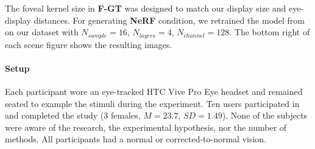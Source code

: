 The foveal kernel size in {\bf F-GT} was designed to match our display size and eye-display distances.
For generating {\bf NeRF} condition, we retrained the model from \cite{mildenhall2020nerf} on our dataset with $N_{sample}=16$, $N_{layers}=4$, $N_{channel}=128$. The bottom right of each scene figure  shows the resulting images. 


\paragraph{Setup}
Each participant wore an eye-tracked HTC Vive Pro Eye headset and remained seated to example the stimuli during the experiment.
Ten users participated in and completed the study (3 females, $M=23.7$, $SD=1.49$). 
None of the subjects were aware of the research, the experimental hypothesis, nor the number of methods. All participants had a normal or corrected-to-normal vision.

